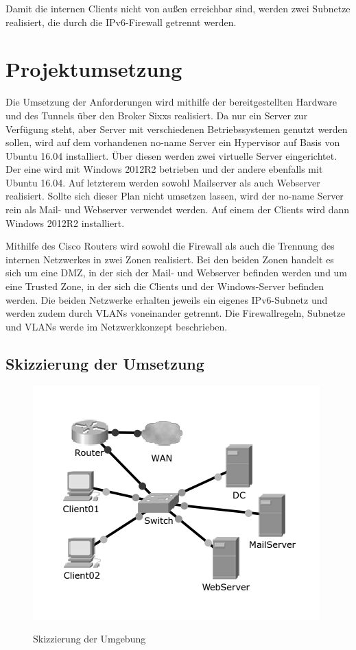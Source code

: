 Damit die internen Clients nicht von außen erreichbar sind, werden zwei Subnetze realisiert, die durch die IPv6-Firewall getrennt werden.
\section{Projektumsetzung}

Die Umsetzung der Anforderungen wird mithilfe der bereitgestellten Hardware und des Tunnels über den Broker Sixxs realisiert. Da nur ein Server zur Verfügung steht, aber Server mit verschiedenen Betriebssystemen genutzt werden sollen, wird auf dem vorhandenen no-name Server ein Hypervisor auf Basis von Ubuntu 16.04 installiert. Über diesen werden zwei virtuelle Server eingerichtet. Der eine wird mit Windows 2012R2 betrieben und der andere ebenfalls mit Ubuntu 16.04. Auf letzterem werden sowohl Mailserver als auch Webserver realisiert. Sollte sich dieser Plan nicht umsetzen lassen, wird der no-name Server rein als Mail- und Webserver verwendet werden. Auf einem der Clients wird dann Windows 2012R2 installiert.

Mithilfe des Cisco Routers wird sowohl die Firewall als auch die Trennung des internen Netzwerkes in zwei Zonen realisiert. Bei den beiden Zonen handelt es sich um eine DMZ, in der sich der Mail- und Webserver befinden werden und um eine Trusted Zone, in der sich die Clients und der Windows-Server befinden werden. Die beiden Netzwerke erhalten jeweils ein eigenes IPv6-Subnetz und werden zudem durch VLANs voneinander getrennt. Die Firewallregeln, Subnetze und VLANs werde im Netzwerkkonzept beschrieben.

\subsection{Skizzierung der Umsetzung}

\begin{figure}
\includegraphics[scale=0.5]{../packettracer/8gruppe_netzaufbau.png}
\label{skizzierung-umsetzung}
\caption{Skizzierung der Umgebung}
\end{figure}

